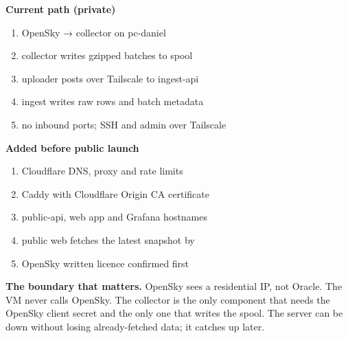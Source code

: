 \documentclass[10.5pt]{article}
\begin{document}
\vspace{4pt}
\begin{minipage}[t]{0.49\linewidth}
\begin{accentcard}
{\bfseries Current path (private)}
\begin{enumerate}[leftmargin=1.25em,itemsep=1.5pt,topsep=2pt]
  \item OpenSky → collector on pc-daniel
  \item collector writes gzipped batches to spool
  \item uploader posts over Tailscale to ingest-api
  \item ingest writes raw rows and batch metadata
  \item no inbound ports; SSH and admin over Tailscale
\end{enumerate}
\end{accentcard}
\end{minipage}\hfill
\begin{minipage}[t]{0.49\linewidth}
\begin{violetcard}
{\bfseries Added before public launch}
\begin{enumerate}[leftmargin=1.25em,itemsep=1.5pt,topsep=2pt]
  \item Cloudflare DNS, proxy and rate limits
  \item Caddy with Cloudflare Origin CA certificate
  \item public-api, web app and Grafana hostnames
  \item public web fetches the latest snapshot by 
  \item OpenSky written licence confirmed first
\end{enumerate}
\end{violetcard}
\end{minipage}

\vspace{4pt}
\begin{warncard}
{\bfseries The boundary that matters.} OpenSky sees a residential IP, not Oracle. The VM never calls OpenSky. The collector is the only component that needs the OpenSky client secret and the only one that writes the spool. The server can be down without losing already-fetched data; it catches up later.
\end{warncard}

\newpage
{}
\end{document}
